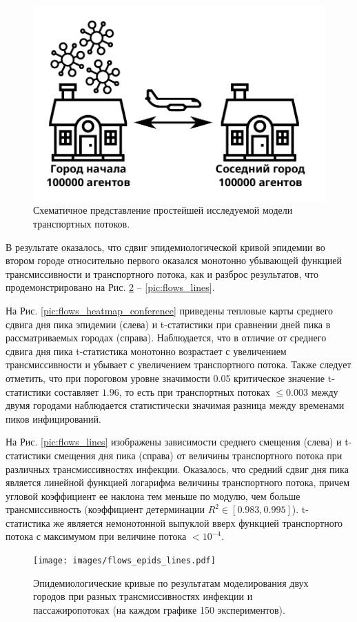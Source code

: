 \documentclass[a4paper,12pt]{article} %
\begin{document}
\begin{figure}[H]
    \centering
    \includegraphics[width=0.5\linewidth]{images/basicflows.pdf}
    \caption{Схематичное представление простейшей исследуемой модели транспортных потоков.}
    \label{pic:basicflows}
\end{figure}


В результате оказалось, что сдвиг эпидемиологической кривой эпидемии во втором городе относительно первого оказался монотонно убывающей функцией трансмиссивности и транспортного потока, как и разброс результатов, что продемонстрировано на Рис. \ref{pic:flows_epids_lines} -- \ref{pic:flows_lines}.

На Рис. \ref{pic:flows_heatmap_conference} приведены тепловые карты среднего сдвига дня пика эпидемии (слева) и t-статистики при сравнении дней пика в рассматриваемых городах (справа). Наблюдается, что в отличие от среднего сдвига дня пика t-статистика монотонно возрастает с увеличением трансмиссивности и убывает с увеличением транспортного потока. Также следует отметить, что при пороговом уровне значимости 0.05 критическое значение t-статистики составляет $1.96$, то есть при транспортных потоках $\leqslant 0.003$ между двумя городами наблюдается статистически значимая разница между временами пиков инфицирований.

На Рис. \ref{pic:flows_lines} изображены зависимости среднего смещения (слева) и t-статистики смещения дня пика (справа) от величины транспортного потока при различных трансмиссивностях инфекции. Оказалось, что средний сдвиг дня пика является линейной функцией логарифма величины транспортного потока, причем угловой коэффициент ее наклона тем меньше по модулю, чем больше трансмиссивность (коэффициент детерминации $R^2 \in [0.983, 0.995]$). t-статистика же является немонотонной выпуклой вверх функцией транспортного потока с максимумом при величине потока $< 10^{-4}$.

\begin{figure}[H]
    \centering
    \texttt{[image: images/flows\_epids\_lines.pdf]}
    \caption{Эпидемиологические кривые по результатам моделирования двух городов при разных трансмиссивностях инфекции и пассажиропотоках (на каждом графике 150 экспериментов).}
    \label{pic:flows_epids_lines}
\end{figure}
\end{document}
